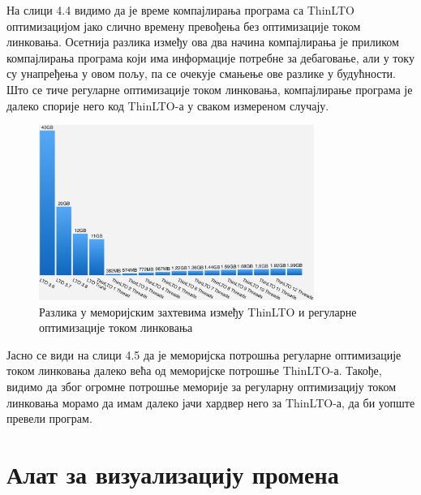 \documentclass[12pt,oneside]{memoir}
\begin{document}
На слици 4.4 видимо да је време компајлирања програма са ThinLTO оптимизацијом
јако слично времену превођења без оптимизације током линковања.
Осетнија разлика између ова два начина компајлирања је приликом компајлирања
програма који има информације потребне за дебаговање, али у току су унапређења
у овом пољу, па се очекује смањење ове разлике у будућности.
Што се тиче регуларне оптимизације током линковања, компајлирање програма
је далеко спорије него код ThinLTO-а у сваком измереном случају.
 
\begin{figure}[!ht]
  \centering
  \includegraphics[width=0.8\textwidth]{memory.png}
  \caption{Разлика у меморијским захтевима
   између ThinLTO и регуларне оптимизације током линковања }
  \label{fig:grafikon}
\end{figure}

Јасно се види на слици 4.5 да је меморијска потрошња регуларне оптимизације
током линковања далеко већа од меморијске потрошње ThinLTO-а.
Такође, видимо да због огромне потрошње меморије за регуларну оптимизацију
током линковања морамо да имам далеко јачи хардвер него за  ThinLTO-а, да би уопште
превели програм.

\chapter{Алат за визуализацију промена}
\end{document}
